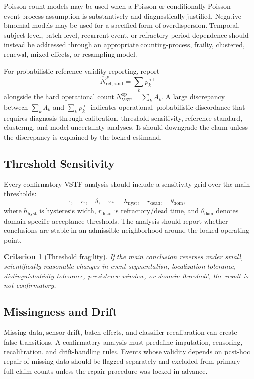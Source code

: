 \documentclass[11pt,a4paper]{article}
\newtheorem{criterion}{Criterion}
\newcommand{\VST}{\ensuremath{\mathrm{VST}}}
\newcommand{\1}{\mathbf{1}}
\begin{document}
Poisson count models may be used when a Poisson or conditionally Poisson event-process assumption is substantively and diagnostically justified. Negative-binomial models may be used for a specified form of overdispersion. Temporal, subject-level, batch-level, recurrent-event, or refractory-period dependence should instead be addressed through an appropriate counting-process, frailty, clustered, renewal, mixed-effects, or resampling model.

For probabilistic reference-validity reporting, report
\[
  \widehat{N}_{\mathrm{ref,cand}}^{\,p}=\sum_k p_k^{\mathrm{ref}}
\]
alongside the hard operational count $N_{\VST}^{\mathrm{op}}=\sum_k A_k$. A large discrepancy between $\sum_k A_k$ and $\sum_k p_k^{\mathrm{ref}}$ indicates operational--probabilistic discordance that requires diagnosis through calibration, threshold-sensitivity, reference-standard, clustering, and model-uncertainty analyses. It should downgrade the claim unless the discrepancy is explained by the locked estimand.

\subsection{Threshold Sensitivity}

Every confirmatory VSTF analysis should include a sensitivity grid over the main thresholds:
\[
  \epsilon,\quad \alpha,\quad \delta,\quad \tau_\ast,\quad
  h_{\mathrm{hyst}},\quad r_{\mathrm{dead}},\quad \theta_{\mathrm{dom}},
\]
where $h_{\mathrm{hyst}}$ is hysteresis width, $r_{\mathrm{dead}}$ is refractory/dead time, and $\theta_{\mathrm{dom}}$ denotes domain-specific acceptance thresholds. The analysis should report whether conclusions are stable in an admissible neighborhood around the locked operating point.

\begin{criterion}[Threshold fragility]
If the main conclusion reverses under small, scientifically reasonable changes in event segmentation, localization tolerance, distinguishability tolerance, persistence window, or domain threshold, the result is not confirmatory.
\end{criterion}

\subsection{Missingness and Drift}

Missing data, sensor drift, batch effects, and classifier recalibration can create false transitions. A confirmatory analysis must predefine imputation, censoring, recalibration, and drift-handling rules. Events whose validity depends on post-hoc repair of missing data should be flagged separately and excluded from primary full-claim counts unless the repair procedure was locked in advance.
\end{document}
